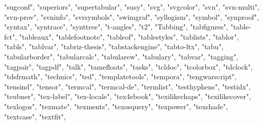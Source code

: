 \documentclass[
]{article}
\newenvironment{Shaded}{\begin{snugshade}}{\end{snugshade}}
\newcommand{\NormalTok}[1]{#1}
\newcommand{\StringTok}[1]{\textcolor[rgb]{0.31,0.60,0.02}{#1}}
\begin{document}
\begin{Shaded}
\begin{Highlighting}[]
\StringTok{"sugconf"}\NormalTok{, }\StringTok{"superiors"}\NormalTok{, }\StringTok{"supertabular"}\NormalTok{, }\StringTok{"susy"}\NormalTok{, }\StringTok{"svg"}\NormalTok{, }\StringTok{"svgcolor"}\NormalTok{, }
\StringTok{"svn"}\NormalTok{, }\StringTok{"svn{-}multi"}\NormalTok{, }\StringTok{"svn{-}prov"}\NormalTok{, }\StringTok{"svninfo"}\NormalTok{, }\StringTok{"svrsymbols"}\NormalTok{, }\StringTok{"swimgraf"}\NormalTok{, }
\StringTok{"syllogism"}\NormalTok{, }\StringTok{"symbol"}\NormalTok{, }\StringTok{"synproof"}\NormalTok{, }\StringTok{"syntax"}\NormalTok{, }\StringTok{"syntrace"}\NormalTok{, }\StringTok{"synttree"}\NormalTok{, }
\StringTok{"t{-}angles"}\NormalTok{, }\StringTok{"t2"}\NormalTok{, }\StringTok{"Tabbing"}\NormalTok{, }\StringTok{"tabfigures"}\NormalTok{, }\StringTok{"table{-}fct"}\NormalTok{, }\StringTok{"tableaux"}\NormalTok{, }
\StringTok{"tablefootnote"}\NormalTok{, }\StringTok{"tableof"}\NormalTok{, }\StringTok{"tablestyles"}\NormalTok{, }\StringTok{"tablists"}\NormalTok{, }\StringTok{"tablor"}\NormalTok{, }
\StringTok{"tabls"}\NormalTok{, }\StringTok{"tablvar"}\NormalTok{, }\StringTok{"tabriz{-}thesis"}\NormalTok{, }\StringTok{"tabstackengine"}\NormalTok{, }\StringTok{"tabto{-}ltx"}\NormalTok{, }
\StringTok{"tabu"}\NormalTok{, }\StringTok{"tabularborder"}\NormalTok{, }\StringTok{"tabularcalc"}\NormalTok{, }\StringTok{"tabularew"}\NormalTok{, }\StringTok{"tabulary"}\NormalTok{, }
\StringTok{"tabvar"}\NormalTok{, }\StringTok{"tagging"}\NormalTok{, }\StringTok{"tagpair"}\NormalTok{, }\StringTok{"tagpdf"}\NormalTok{, }\StringTok{"talk"}\NormalTok{, }\StringTok{"tamefloats"}\NormalTok{, }
\StringTok{"tasks"}\NormalTok{, }\StringTok{"tcldoc"}\NormalTok{, }\StringTok{"tcolorbox"}\NormalTok{, }\StringTok{"tdclock"}\NormalTok{, }\StringTok{"tdsfrmath"}\NormalTok{, }\StringTok{"technics"}\NormalTok{, }
\StringTok{"ted"}\NormalTok{, }\StringTok{"templatetools"}\NormalTok{, }\StringTok{"tempora"}\NormalTok{, }\StringTok{"tengwarscript"}\NormalTok{, }\StringTok{"tensind"}\NormalTok{, }
\StringTok{"tensor"}\NormalTok{, }\StringTok{"termcal"}\NormalTok{, }\StringTok{"termcal{-}de"}\NormalTok{, }\StringTok{"termlist"}\NormalTok{, }\StringTok{"testhyphens"}\NormalTok{, }
\StringTok{"testidx"}\NormalTok{, }\StringTok{"teubner"}\NormalTok{, }\StringTok{"tex{-}label"}\NormalTok{, }\StringTok{"tex{-}locale"}\NormalTok{, }\StringTok{"tex4ebook"}\NormalTok{, }
\StringTok{"texilikechaps"}\NormalTok{, }\StringTok{"texilikecover"}\NormalTok{, }\StringTok{"texlogos"}\NormalTok{, }\StringTok{"texmate"}\NormalTok{, }\StringTok{"texments"}\NormalTok{, }
\StringTok{"texosquery"}\NormalTok{, }\StringTok{"texpower"}\NormalTok{, }\StringTok{"texshade"}\NormalTok{, }\StringTok{"textcase"}\NormalTok{, }\StringTok{"textfit"}\NormalTok{, }

\end{Highlighting}
\end{Shaded}
\end{document}
